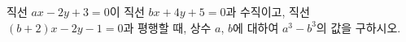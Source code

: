 직선 $ax-2y+3=0$이 직선 $bx+4y+5=0$과 수직이고, 직선 $(b+2)x-2y-1=0$과 평행할 때, 상수 $a$, $b$에 대하여 $a^3-b^3$의 값을 구하시오.

